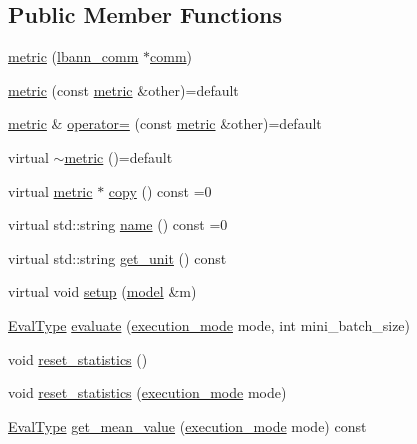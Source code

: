 \subsection*{Public Member Functions}
\begin{DoxyCompactItemize}
\item 
\hyperlink{classlbann_1_1metric_a3cd2d4f7dcbf94f70b3b8560a3171d9d}{metric} (\hyperlink{classlbann_1_1lbann__comm}{lbann\+\_\+comm} $\ast$\hyperlink{file__io_8cpp_ab048c6f9fcbcfaa57ce68b00263dbebe}{comm})
\item 
\hyperlink{classlbann_1_1metric_ac2fc993e31fed5298c4e321b315b77a0}{metric} (const \hyperlink{classlbann_1_1metric}{metric} \&other)=default
\item 
\hyperlink{classlbann_1_1metric}{metric} \& \hyperlink{classlbann_1_1metric_a4324342dab4892199a47df1d78b2cef5}{operator=} (const \hyperlink{classlbann_1_1metric}{metric} \&other)=default
\item 
virtual \hyperlink{classlbann_1_1metric_ae173eae981ed474f125a5462e734802b}{$\sim$metric} ()=default
\item 
virtual \hyperlink{classlbann_1_1metric}{metric} $\ast$ \hyperlink{classlbann_1_1metric_a2a4498d41f77da8585552f485caab167}{copy} () const =0
\item 
virtual std\+::string \hyperlink{classlbann_1_1metric_af455d7b6874d3491bc04f0f2ebfcab51}{name} () const =0
\item 
virtual std\+::string \hyperlink{classlbann_1_1metric_a13fd302dec85190b877f7146529e516c}{get\+\_\+unit} () const
\item 
virtual void \hyperlink{classlbann_1_1metric_a898d23e410297378db2fe9f8d1754fe0}{setup} (\hyperlink{classlbann_1_1model}{model} \&m)
\item 
\hyperlink{base_8hpp_a3266f5ac18504bbadea983c109566867}{Eval\+Type} \hyperlink{classlbann_1_1metric_ab4e14cb4296c7b47719071b210448dec}{evaluate} (\hyperlink{base_8hpp_a2781a159088df64ed7d47cc91c4dc0a8}{execution\+\_\+mode} mode, int mini\+\_\+batch\+\_\+size)
\item 
void \hyperlink{classlbann_1_1metric_af7747feb8bc7a5ee039876a70fae1b0c}{reset\+\_\+statistics} ()
\item 
void \hyperlink{classlbann_1_1metric_a27a3d8c073b85297b902ba35137926b4}{reset\+\_\+statistics} (\hyperlink{base_8hpp_a2781a159088df64ed7d47cc91c4dc0a8}{execution\+\_\+mode} mode)
\item 
\hyperlink{base_8hpp_a3266f5ac18504bbadea983c109566867}{Eval\+Type} \hyperlink{classlbann_1_1metric_a2926c6b391dc8c3e3d13d0199317c570}{get\+\_\+mean\+\_\+value} (\hyperlink{base_8hpp_a2781a159088df64ed7d47cc91c4dc0a8}{execution\+\_\+mode} mode) const

\end{DoxyCompactItemize}
